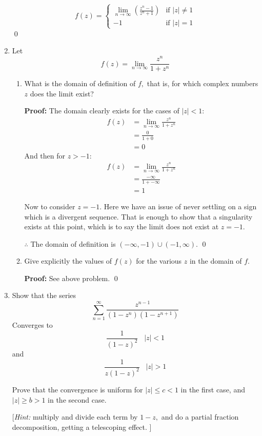 \begin{enumerate}
	\[	
	f(z) =
	\begin{cases}
		\lim_{n \to \infty} \left( \frac{z^n - 1}{z^n + 1} \right) & \text{if } |z| \not = 1 \\
		-1 & \text{if } |z| = 1
	\end{cases} 
	\]
	\qed

	\item Let \[ f(z) = \lim_{n \to \infty} \frac{z^n}{1 + z^n} \]
	\begin{enumerate}
		\item What is the domain of definition of $f,$ that is, for which complex numbers $z$ does the limit exist?
		
		\textbf{Proof:}
		The domain clearly exists for the cases of $|z| < 1$: 
		\begin{align*}
			f(z) &= \lim_{n \to \infty} \frac{z^n}{1 + z^n} \\
			&= \frac{0}{1 + 0} \\
			&= 0
		\end{align*}
		And then for $z > -1$:
		\begin{align*}
			f(z) &= \lim_{n \to \infty} \frac{z^n}{1 + z^n} \\
			&= \frac{-\infty}{1 + -\infty} \\
			&= 1
		\end{align*}

		Now to consider $z = -1$. Here we have an issue of never settling on a sign which is a divergent sequence.
		That is enough to show that a singularity exists at this point, 
		which is to say the limit does not exist at $z = -1$.

		$\therefore$ The domain of definition is $(-\infty, -1) \cup (-1, \infty)$.
		\qed
	
		\item Give explicitly the values of $f(z)$ for the various $z$ in the domain of $f.$
		
		\textbf{Proof:}
		See above problem. \qed
	
	\end{enumerate}

	\item Show that the series
	\[ \sum_{n = 1}^{\infty} \frac{z^{n - 1}}{(1 - z^n )(1 - z^{n + 1})} \]
	Converges to
	\[ \frac{1}{(1 - z)^2 } \;\;\; |z| < 1 \]
	and
	\[\frac{1}{z(1 - z)^2 } \;\;\; |z| > 1\]

	Prove that the convergence is uniform for $|z| \leq c < 1$ in the first case, and $|z| \geq b > 1$ in the second case. 

	[\textit{Hint:} multiply and divide each term by $1 - z,$ and do a partial fraction decomposition, getting a telescoping effect. ]


\end{enumerate}
